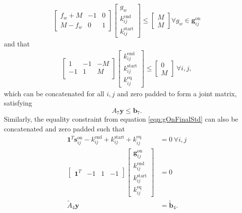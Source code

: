 \begin{equation} \label{eqn:gOnFinalPart1}\begin{aligned}
	\begin{bmatrix}f_w + M & -1 & 0\\
		       M - f_w & 0 & 1 
	\end{bmatrix} 
	\begin{bmatrix}g_w                 \\
		       k_{ij}^{\text{end}} \\ 
		       k_{ij}^{\text{start}}
	\end{bmatrix} \le
	\begin{bmatrix} M \\
	                M 
	\end{bmatrix} \forall g_w \in \mathbf{g}_{ij}^{\text{on}}
\end{aligned}\end{equation} 
and that
\begin{equation} \label{eqn:kEqStd}\begin{aligned}
	\begin{bmatrix}1 & -1 & -M \\
		       -1 & 1 & M  \\
		       \end{bmatrix} \begin{bmatrix}k_{ij}^{\text{end}} \\ k_{ij}^{\text{start}} \\ k_{ij}^{\text{eq}} \end{bmatrix} \le \begin{bmatrix} 0 \\ M\end{bmatrix} \ \forall i,j,
\end{aligned} \end{equation}
which can be concatenated for all $i,j$ and zero padded to form a joint matrix, satisfying 
\begin{equation}
	A_7\mathbf{y} \le \mathbf{b}_7.
\end{equation}
Similarly, the equality constraint from equation \ref{eqn:gOnFinalStd} can also be concatenated and zero padded such that
\begin{equation} \begin{aligned}
	\mathbf{1}^T\mathbf{s}_{ij}^{\text{on}} - k_{ij}^{\text{end}} + k_{ij}^{\text{start}} + k_{ij}^{\text{eq}} &= 0 \ \forall i,j\\
	\begin{bmatrix}\mathbf{1}^T & - 1 & 1 & -1\end{bmatrix} \begin{bmatrix}\mathbf{g}_{ij}^{\text{on}} \\ k_{ij}^{\text{end}} \\ k_{ij}^{\text{start}} \\ k_{ij}^{\text{eq}} \end{bmatrix} &= 0 \\
		\tilde{A}_4\mathbf{y} &= \tilde{\mathbf{b}}_4.
\end{aligned} \end{equation}
